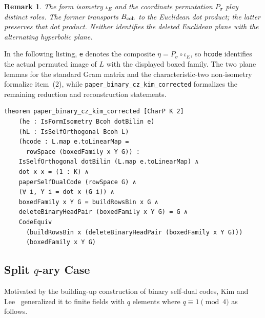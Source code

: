 \documentclass[12pt]{article}
\newtheorem{remark}[theorem]{Remark}
\begin{document}
\begin{remark}{\rm
The form isometry \(\iota_E\) and the coordinate permutation \(P_\sigma\)
play distinct roles.  The former transports \(B_{\rm coh}\) to the Euclidean
dot product; the latter preserves that dot product.  Neither identifies the
deleted Euclidean plane with the alternating hyperbolic plane.
}
\end{remark}

\noindent
In the following listing, \texttt{e} denotes the composite
\(\eta=P_\sigma\circ\iota_E\), so \texttt{hcode} identifies the actual
permuted image of \(L\) with the displayed boxed family. The two plane
lemmas for the standard Gram matrix and the characteristic-two non-isometry
formalize item~(2), while
\texttt{paper\_binary\_cz\_kim\_corrected} formalizes the remaining
reduction and reconstruction statements.

\begin{lstlisting}[caption={Lean for Theorem~\ref{thm:binary-cz-kim}.}]
theorem paper_binary_cz_kim_corrected [CharP K 2]
    (he : IsFormIsometry Bcoh dotBilin e)
    (hL : IsSelfOrthogonal Bcoh L)
    (hcode : L.map e.toLinearMap =
      rowSpace (boxedFamily x Y G)) :
    IsSelfOrthogonal dotBilin (L.map e.toLinearMap) ∧
    dot x x = (1 : K) ∧
    paperSelfDualCode (rowSpace G) ∧
    (∀ i, Y i = dot x (G i)) ∧
    boxedFamily x Y G = buildRowsBin x G ∧
    deleteBinaryHeadPair (boxedFamily x Y G) = G ∧
    CodeEquiv
      (buildRowsBin x (deleteBinaryHeadPair (boxedFamily x Y G)))
      (boxedFamily x Y G)
\end{lstlisting}

\subsection{\texorpdfstring{\hspace{0.2em}Split \(q\)-ary Case}{Split q-ary Case}}

Motivated by the building-up construction of binary self-dual codes, Kim and Lee~\cite{KimLee} generalized it to finite fields with $q$ elements where $q \equiv 1 \pmod{4}$ as follows.
\end{document}
